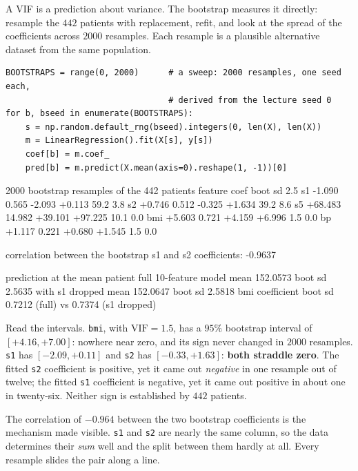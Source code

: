 \documentclass[11pt]{article}
\begin{document}
A VIF is a prediction about variance. The bootstrap measures it directly:
resample the $442$ patients with replacement, refit, and look at the spread of
the coefficients across $2000$ resamples. Each resample is a plausible
alternative dataset from the same population.

\begin{lstlisting}
BOOTSTRAPS = range(0, 2000)      # a sweep: 2000 resamples, one seed each,
                                 # derived from the lecture seed 0
for b, bseed in enumerate(BOOTSTRAPS):
    s = np.random.default_rng(bseed).integers(0, len(X), len(X))
    m = LinearRegression().fit(X[s], y[s])
    coef[b] = m.coef_
    pred[b] = m.predict(X.mean(axis=0).reshape(1, -1))[0]
\end{lstlisting}
\begin{codeout}
2000 bootstrap resamples of the 442 patients
feature    coef    boot sd    2.5%
s1         -1.090    0.565    -2.093    +0.113    59.2      3.8%
s2         +0.746    0.512    -0.325    +1.634    39.2      8.6%
s5        +68.483   14.982   +39.101   +97.225    10.1      0.0%
bmi        +5.603    0.721    +4.159    +6.996     1.5      0.0%
bp         +1.117    0.221    +0.680    +1.545     1.5      0.0%

correlation between the bootstrap s1 and s2 coefficients: -0.9637

prediction at the mean patient
   full 10-feature model  mean 152.0573  boot sd 2.5635
   with s1 dropped        mean 152.0647  boot sd 2.5818
   bmi coefficient        boot sd 0.7212 (full) vs 0.7374 (s1 dropped)
\end{codeout}

Read the intervals. \texttt{bmi}, with $\mathrm{VIF} = 1.5$, has a $95\%$
bootstrap interval of $[+4.16, +7.00]$: nowhere near zero, and its sign never
changed in $2000$ resamples. \texttt{s1} has $[-2.09, +0.11]$ and \texttt{s2}
has $[-0.33, +1.63]$: \textbf{both straddle zero}. The fitted \texttt{s2}
coefficient is positive, yet it came out \emph{negative} in one resample out
of twelve; the fitted \texttt{s1} coefficient is negative, yet it came out
positive in about one in twenty-six. Neither sign is established by $442$
patients.

The correlation of $-0.964$ between the two bootstrap coefficients is the
mechanism made visible. \texttt{s1} and \texttt{s2} are nearly the same
column, so the data determines their \emph{sum} well and the split between
them hardly at all. Every resample slides the pair along a line.
\end{document}
